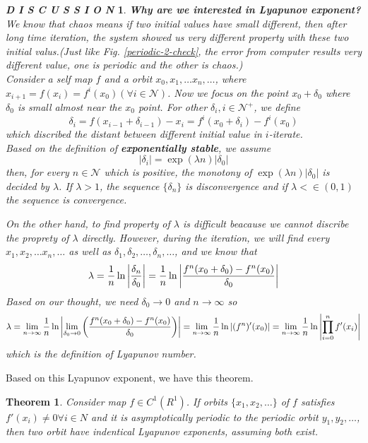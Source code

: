 \documentclass[12pt]{article}
\theoremstyle{plain}
\newtheorem{theorem}{\textbf{Theorem}}[section]
\newtheorem{discussion}{\textit{D I S C U S S I O N}}[section]
\begin{document}
\begin{discussion}\label{Lyapunov-exp-discussion} \textbf{Why are we interested in Lyapunov exponent?}
\\\noindent We know that chaos means if two initial values have small different, then after long time iteration, the system showed us very different property with these two initial valus.(Just like Fig. \ref{periodic-2-check}, the error from computer results very different value, one is periodic and the other is chaos.)
\\\noindent Consider a self map $f$ and a orbit $x_0, x_1, \ldots x_n, \ldots$, where $x_{i+1} = f(x_i) = f^{i}(x_0) (\forall i \in \mathcal N)$. Now we focus on the point $x_0 + \delta_0$ where $\delta_0$ is small almost near the $x_0$ point. For other $\delta_i, i \in \mathcal N^+$, we define 
$$
\delta_i = f(x_{i-1} + \delta_{i-1}) - x_i = f^i(x_0 + \delta_i) - f^i(x_0)
$$
which discribed the distant between different initial value in $i$-iterate.
\\\noindent Based on the definition of \textbf{exponentially stable}, we assume  
$$
|\delta_i| = \exp(\lambda n)|\delta_0|
$$
then, for every $n \in \mathcal N$ which is positive, the monotony of $\exp(\lambda n)|\delta_0|$ is decided by $\lambda$. If $\lambda > 1$, the sequence $\{\delta_n\}$ is disconvergence and if $\lambda < \in (0, 1)$ the sequence is convergence. 

On the other hand, to find property of $\lambda$ is difficult beacause we cannot discribe the proprety of $\lambda$ directly. However, during the iteration, we will find every $x_1, x_2, \ldots x_n, \ldots$ as well as $\delta_1, \delta_2, \ldots, \delta_n, \ldots$, and we know that 
$$
\lambda = {1\over n}\ln{\left|\delta_n \over \delta_0\right|} 
= {1\over n}\ln{\left|f^n(x_0 + \delta_0) - f^n(x_0) \over \delta_0\right|}
$$
Based on our thought, we need $\delta_0 \rightarrow 0$ and $n \rightarrow \infty$ so
$$
\lambda = \lim_{n\rightarrow \infty}{1\over n}\ln{\left|\lim_{\delta_0 \rightarrow 0}\left(f^n(x_0 + \delta_0) - f^n(x_0) \over \delta_0\right)\right|} 
= \lim_{n\rightarrow \infty}{1\over n}\ln{\left|(f^n)'(x_0)\right|} 
= \lim_{n\rightarrow \infty}{1\over n}\ln{\left|\prod_{i = 0}^{n}f'(x_i)\right|} 
$$
which is the definition of Lyapunov number.
\end{discussion}


Based on this Lyapunov exponent, we have this theorem.
\begin{theorem}\label{Lyapunov-exponent-asymptotically-periodic} Consider map $f \in C^1(R^1)$. If orbits $\{x_1, x_2, \ldots\}$ of $f$ satisfies $f'(x_i) \neq 0 \forall i \in N$ and it is asymptotically periodic to the periodic orbit ${y_1, y_2, \ldots}$, then two orbit have indentical Lyapunov exponents, assuming both exist.
\end{theorem}
\end{document}
